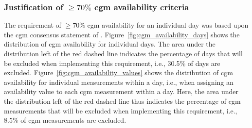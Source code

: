\documentclass[11pt,a4paper]{article}
\begin{document}
\subsubsection{Justification of $\geq 70\%$ \gls{cgm} availability criteria}
The requirement of $\geq 70\%$ \gls{cgm} availability for an individual day was based upon the \gls{cgm} consensus statement of \citet{29162583}. Figure~\ref{fig:cgm_availability_days} shows the distribution of \gls{cgm} availability for individual days. The area under the distribution left of the red dashed line indicates the percentage of days that will be excluded when implementing this requirement, i.e., 30.5\% of days are excluded. Figure~\ref{fig:cgm_availability_values} shows the distribution of \gls{cgm} availability for individual measurements within a day, i.e., when assigning an availability value to each \gls{cgm} measurement within a day. Here, the area under the distribution left of the red dashed line thus indicates the percentage of \gls{cgm} measurements that will be excluded when implementing this requirement, i.e., 8.5\% of \gls{cgm} measurements are excluded. 
\end{document}
